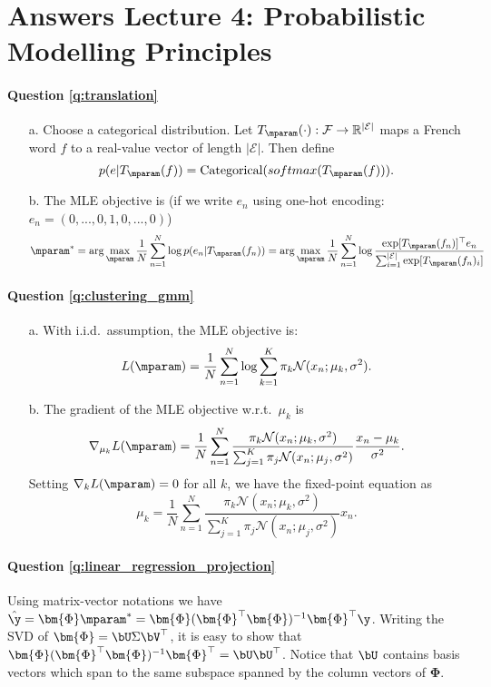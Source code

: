 \section{Answers Lecture 4: Probabilistic Modelling Principles}

\paragraph{Question \ref{q:translation}}
\begin{itemize}
    \item[a.] Choose a categorical distribution. Let $T_{\mparam}(\cdot): \mathcal{F} \rightarrow \mathbb{R}^{|\mathcal{E}|}$ maps a French word $f$ to a real-value vector of length $|\mathcal{E}|$. Then define
    $$p(e | T_{\mparam}(f)) = \text{Categorical}(softmax(T_{\mparam}(f))).$$
    \item[b.] The MLE objective is (if we write $e_n$ using one-hot encoding: $e_n = (0, ..., 0, 1, 0, ..., 0)$)
    $$\mparam^* = \arg\max_{\mparam} \frac{1}{N} \sum_{n=1}^N \log p(e_n | T_{\mparam}(f_n)) = \arg\max_{\mparam} \frac{1}{N} \sum_{n=1}^N \log \frac{\exp[T_{\mparam}(f_n)]^\top e_n}{\sum_{i=1}^{|\mathcal{E}|} \exp[T_{\mparam}(f_n)_i] }$$
\end{itemize}

\paragraph{Question \ref{q:clustering_gmm}}
\begin{itemize}
    \item[a.] With i.i.d.~assumption, the MLE objective is:
    $$L(\mparam) = \frac{1}{N} \sum_{n=1}^N \log \sum_{k=1}^K \pi_k \mathcal{N}(x_n; \mu_k, \sigma^2).$$
    \item[b.] The gradient of the MLE objective w.r.t.~$\mu_k$ is
    $$\nabla_{\mu_k} L(\mparam) = \frac{1}{N} \sum_{n=1}^N \frac{\pi_k \mathcal{N}(x_n; \mu_k, \sigma^2)}{\sum_{j=1}^K \pi_j \mathcal{N}(x_n; \mu_j, \sigma^2) } \frac{x_n - \mu_k}{\sigma^2}.$$
    Setting $\nabla_{k} L(\mparam) = 0$ for all $k$, we have the fixed-point equation as
    $$\mu_k = \frac{1}{N} \sum_{n=1}^N \frac{\pi_k \mathcal{N}(x_n; \mu_k, \sigma^2)}{\sum_{j=1}^K \pi_j \mathcal{N}(x_n; \mu_j, \sigma^2) } x_n.$$
\end{itemize}


\paragraph{Question \ref{q:linear_regression_projection}}
Using matrix-vector notations we have $\hat{\y} = \bm{\Phi} \mparam^* = \bm{\Phi} (\bm{\Phi}^\top \bm{\Phi})^{-1} \bm{\Phi}^\top \y$. Writing the SVD of $\bm{\Phi} = \bU \Sigma \bV^\top$, it is easy to show that $\bm{\Phi} (\bm{\Phi}^\top \bm{\Phi})^{-1} \bm{\Phi}^\top = \bU \bU^\top$. Notice that $\bU$ contains basis vectors which span to the same subspace spanned by the column vectors of $\bm{\Phi}$.